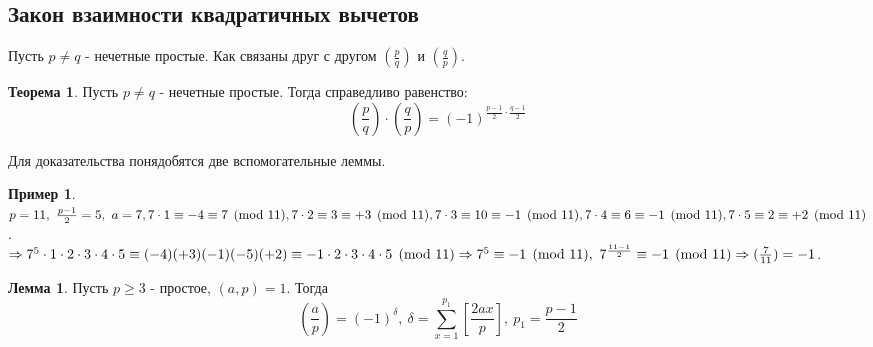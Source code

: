 \documentclass[a4paper, 12pt]{article}
\theoremstyle{definition}
\newtheorem{theorem}{Теорема}[section]
\newtheorem{lemma}{Лемма}[section]
\newtheorem*{example}{Пример}
\begin{document}
    \subsection*{Закон взаимности квадратичных вычетов}
    Пусть $p\ne q$ - нечетные простые. Как связаны друг с другом $(\frac{p}{q})$ и $(\frac{q}{p})$.
    \begin{theorem} \label{th10.5} 
        Пусть $p\ne q$ - нечетные простые. Тогда справедливо равенство:
        \[(\frac{p}{q})\cdot (\frac{q}{p})=(-1)^{\frac{p-1}{2}\cdot \frac{q-1}{2}}\]
    \end{theorem} 
    Для доказательства понядобятся две вспомогательные леммы. 
    \begin{example}
        $p=11,\ \frac{p-1}{2}=5,\ a=7,\\ 7\cdot 1\equiv -4 \equiv 7\pmod{11},\\ 7\cdot 2\equiv 3\equiv +3\pmod{11},\\ 7\cdot 3\equiv 10 \equiv -1\pmod{11},\\ 7\cdot 4\equiv 6\equiv -1 \pmod{11},\\ 7\cdot 5 \equiv 2 \equiv +2 \pmod{11}$.\\
        $\Rightarrow 7^5\cdot 1\cdot 2\cdot 3\cdot 4\cdot 5\equiv (-4)(+3)(-1)(-5)(+2)\equiv -1\cdot 2\cdot 3\cdot 4\cdot 5\pmod{11}\\
        \Rightarrow 7^5\equiv -1\pmod{11},\ 7^{\frac{11-1}{2}}\equiv -1\pmod{11}\Rightarrow (\frac{7}{11})=-1$.
    \end{example}
    \begin{lemma}\label{lemma10.1}
        Пусть $p\geq 3$ - простое, $(a,p)=1$. Тогда
        \[(\frac{a}{p})=(-1)^{\delta},\ \delta=\sum\limits_{x=1}^{p_1}[\frac{2ax}{p}],\ p_1=\frac{p-1}{2}\]
    \end{lemma} 
\end{document}
